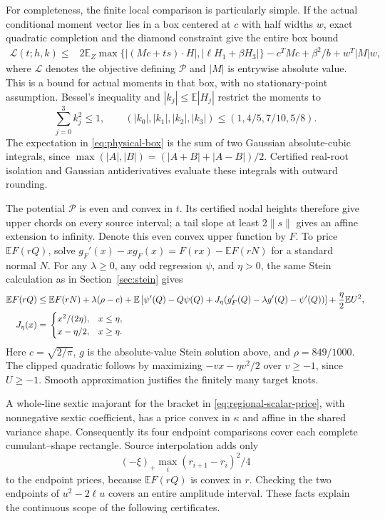 \documentclass[11pt]{article}
\newcommand{\E}{\mathbb E}
\begin{document}
For completeness, the finite local comparison is particularly simple.
If the actual conditional moment vector lies in a box centered at $c$
with half widths $w$, exact quadratic completion and the diamond
constraint give the entire box bound
\begin{align}\label{eq:physical-box}
 \mathcal L(t;h,k)\le{}&
 2\E_Z\max\{|(Mc+ts)\cdot H|,|\ell H_1+\beta H_3|\}
       -c^TMc+\beta^2/b+w^T|M|w,
\end{align}
where $\mathcal L$ denotes the objective defining $\mathcal P$ and
$|M|$ is entrywise absolute value. This is a bound for actual moments
in that box, with no stationary-point assumption. Bessel's inequality
and $|k_j|\le\E|H_j|$ restrict the moments to
\[
 \sum_{j=0}^3k_j^2\le1,\qquad
 (|k_0|,|k_1|,|k_2|,|k_3|)\le(1,4/5,7/10,5/8).
\]
The expectation in \eqref{eq:physical-box} is the sum of two Gaussian
absolute-cubic integrals, since
$\max(|A|,|B|)=(|A+B|+|A-B|)/2$.
Certified real-root isolation and Gaussian antiderivatives evaluate
these integrals with outward rounding.

The potential $\mathcal P$ is even and convex in $t$. Its certified
nodal heights therefore give upper chords on every source interval;
a tail slope at least $2\|s\|$ gives an affine extension to infinity.
Denote this even convex upper function by $F$. To price $\E F(rQ)$,
solve $g_F'(x)-xg_F(x)=F(rx)-\E F(rN)$ for a standard normal $N$.
For any $\lambda\ge0$, any odd regression $\psi$, and $\eta>0$, the
same Stein calculation as in Section~\ref{sec:stein} gives
\begin{align}\label{eq:regional-scalar-price}
 \E F(rQ)\le{}&\E F(rN)+\lambda(\rho-c)
 +\E\left[\psi'(Q)-Q\psi(Q)
 +J_\eta(g_F'(Q)-\lambda g'(Q)-\psi'(Q))\right]
 +\frac\eta2\E U^2,\\
 J_\eta(x)={}&
 \begin{cases}x^2/(2\eta),&x\le\eta,\\x-\eta/2,&x\ge\eta.
 \end{cases}\notag
\end{align}
Here $c=\sqrt{2/\pi}$, $g$ is the absolute-value Stein solution above,
and $\rho=849/1000$. The clipped quadratic follows by maximizing
$-vx-\eta v^2/2$ over $v\ge-1$, since $U\ge-1$.
Smooth approximation justifies the finitely many target knots.

A whole-line sextic majorant for the bracket in
\eqref{eq:regional-scalar-price}, with nonnegative sextic coefficient,
has a price convex in $\kappa$ and affine in the shared variance shape.
Consequently its four endpoint comparisons cover each complete
cumulant--shape rectangle. Source interpolation adds only
\[
 (-\xi)_+\max_i(r_{i+1}-r_i)^2/4
\]
to the endpoint prices, because $\E F(rQ)$ is convex in $r$.
Checking the two endpoints of $u^2-2\ell u$ covers an entire amplitude
interval. These facts explain the continuous scope of the following
certificates.
\end{document}
